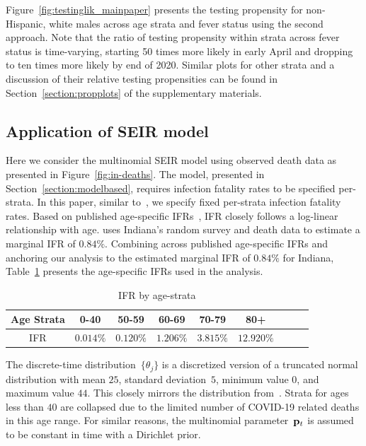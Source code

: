 \documentclass[11pt]{amsart}
\numberwithin{equation}{section}
\theoremstyle{plain}
\begin{document}
 Figure~\ref{fig:testinglik_mainpaper} presents the testing propensity for non-Hispanic, white males across age strata and fever status using the second approach.  Note that the ratio of testing propensity within strata across fever status is time-varying, starting 50 times more likely in early April and dropping to ten times more likely by end of 2020.  Similar plots for other strata and a discussion of their relative testing propensities can be found in Section~\ref{section:propplots} of the supplementary materials.



 \subsection{Application of SEIR model}
 \label{section:application_of_modelbased}

 Here we consider the multinomial SEIR model using observed death data as presented in Figure~\ref{fig:in-deaths}. The model, presented in Section~\ref{section:modelbased}, requires infection fatality rates to be specified per-strata.  In this paper, similar to~\cite{Johndrow2020}, we specify fixed per-strata infection fatality rates.  Based on published age-specific IFRs~\citep{Levin2020}, IFR closely follows a log-linear relationship with age. \cite{Ironse2103272118} uses Indiana's random survey and death data to estimate a marginal IFR of $0.84\%$.  Combining across published age-specific IFRs and anchoring our analysis to the estimated marginal IFR of $0.84\%$ for Indiana, Table~\ref{tab:ifrperage} presents the age-specific IFRs used in the analysis. \begin{table}[!th]
 \begin{tabular}{c | c c c c c c c c}
 Age Strata & 0-40 & 50-59 & 60-69 & 70-79 & 80+ \\ \hline
 IFR & $0.014\%$ & $0.120\%$ & $1.206\%$ & $3.815\%$ & $12.920\%$
 \end{tabular}
 \caption{IFR by age-strata}
 \label{tab:ifrperage}
 \vspace{-1cm}
 \end{table}
 The discrete-time distribution~$\{ \theta_{j} \}$ is a discretized version of a truncated normal distribution with mean $25$, standard deviation~$5$, minimum value $0$, and maximum value $44$.  This closely mirrors the distribution from~\cite{Johndrow2020}. Strata for ages less than $40$ are collapsed due to the limited number of COVID-19 related deaths in this age range. For similar reasons, the multinomial parameter~${\bf p}_t$ is assumed to be constant in time with a Dirichlet prior.
\end{document}
